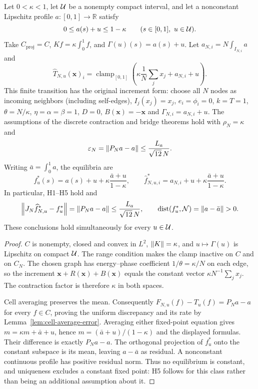 \begin{theorem}\label{thm:realized-nonconstant-bridge}
Let $0<\kappa<1$, let $\mathcal{U}$ be a nonempty compact interval, and let a nonconstant Lipschitz profile $a:[0,1]\to\mathbb{R}$ satisfy
\[
0\leq a(s)+u\leq1-\kappa\qquad(s\in[0,1],\ u\in\mathcal{U}).
\]
Take ${C_{\mathrm{proj}}}=C$, $Kf=\kappa\int_0^1f$, and $\Gamma(u)(s)=a(s)+u$. Let $a_{N,i}=N\int_{I_{N,i}}a$ and
\[
\widehat T_{N,u}(\mathbf{x})_i
=\operatorname{clamp}_{[0,1]}\left(\kappa\frac1N\sum_jx_j+a_{N,i}+u\right).
\]
This finite transition has the original increment form: choose all $N$ nodes as incoming neighbors (including self-edges), $I_j(x_j)=x_j$, $e_i=\phi_i=0$, $k=T=1$, $\theta=N/\kappa$, $\eta=\alpha=\beta=1$, $D=0$, $B(\mathbf{x})=-\mathbf{x}$ and $\Gamma_{N,i}=a_{N,i}+u$. The assumptions of the discrete contraction and bridge theorems hold with $\rho_N=\kappa$ and
\[
\varepsilon_N=\left\lVert P_Na-a \right\rVert\leq\frac{L_a}{\sqrt{12}\,N}.
\]
Writing $\bar a=\int_0^1a$, the equilibria are
\[
f_u^\ast(s)=a(s)+u+\kappa\frac{\bar a+u}{1-\kappa},\qquad
\widehat f_{N,u,i}^\ast=a_{N,i}+u+\kappa\frac{\bar a+u}{1-\kappa}.
\]
In particular, H1--H5 hold and
\[
\left\lVert J_N\widehat f_{N,u}^\ast-f_u^\ast \right\rVert
=\left\lVert P_Na-a \right\rVert\leq\frac{L_a}{\sqrt{12}\,N},\qquad
\operatorname{dist}(f_u^\ast,\mathcal N)=\left\lVert a-\bar a \right\rVert>0.
\]
These conclusions hold simultaneously for every $u\in\mathcal{U}$.
\end{theorem}

\begin{proof}
$C$ is nonempty, closed and convex in $L^2$, $\left\lVert K \right\rVert=\kappa$, and $u\mapsto\Gamma(u)$ is Lipschitz on compact $\mathcal{U}$. The range condition makes the clamp inactive on $C$ and on $C_N$. The chosen graph has energy--phase coefficient $1/\theta=\kappa/N$ on each edge, so the increment $\mathbf{x}+R(\mathbf{x})+B(\mathbf{x})$ equals the constant vector $\kappa N^{-1}\sum_jx_j$. The contraction factor is therefore $\kappa$ in both spaces.

Cell averaging preserves the mean. Consequently $F_{N,u}(f)-T_u(f)=P_Na-a$ for every $f\in C$, proving the uniform discrepancy and its rate by Lemma~\ref{lem:cell-average-error}. Averaging either fixed-point equation gives $m=\kappa m+\bar a+u$, hence $m=(\bar a+u)/(1-\kappa)$ and the displayed formulas. Their difference is exactly $P_Na-a$. The orthogonal projection of $f_u^\ast$ onto the constant subspace is its mean, leaving $a-\bar a$ as residual. A nonconstant continuous profile has positive residual norm. Thus no equilibrium is constant, and uniqueness excludes a constant fixed point: H5 follows for this class rather than being an additional assumption about it.
\end{proof}

